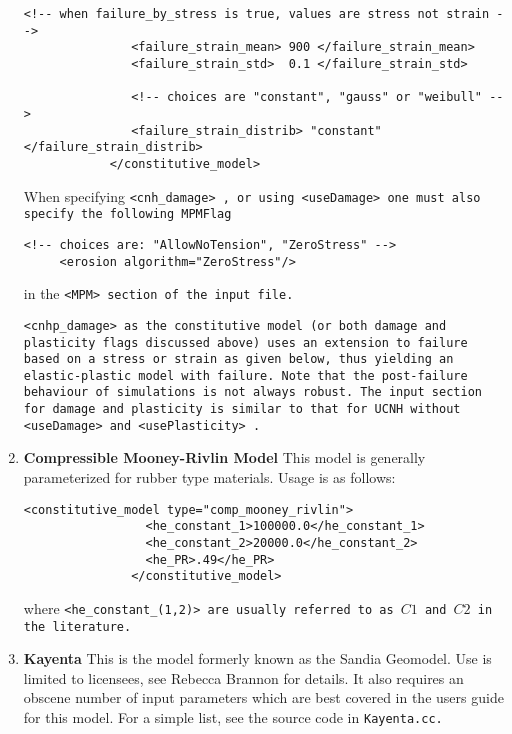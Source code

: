 \begin{enumerate}
\begin{Verbatim}[fontsize=\footnotesize]
               <!-- when failure_by_stress is true, values are stress not strain -->
               <failure_strain_mean> 900 </failure_strain_mean>
               <failure_strain_std>  0.1 </failure_strain_std>

               <!-- choices are "constant", "gauss" or "weibull" -->
               <failure_strain_distrib> "constant" </failure_strain_distrib>
            </constitutive_model>
\end{Verbatim}


When specifying \tt <cnh\_damage> \normalfont, or using \tt <useDamage> \normalfont one must also specify
the following MPMFlag
\begin{Verbatim}[fontsize=\footnotesize]
     <!-- choices are: "AllowNoTension", "ZeroStress" -->
     <erosion algorithm="ZeroStress"/>
\end{Verbatim}
in the \tt <MPM> \normalfont section of the input file.

\tt <cnhp\_damage> \normalfont as the constitutive model (or both damage and plasticity
 flags discussed above) uses an extension
to failure based on a stress or strain as given below, thus yielding an
elastic-plastic model with failure.  Note that the post-failure behaviour of
simulations is not always robust.  The input section for damage and plasticity is
similar to that for UCNH without \tt <useDamage> \normalfont and \tt <usePlasticity> \normalfont.


\item{\bf Compressible Mooney-Rivlin Model} This model is generally parameterized
for rubber type materials.  Usage is as follows:
\begin{Verbatim}[fontsize=\footnotesize]
              <constitutive_model type="comp_mooney_rivlin">
                 <he_constant_1>100000.0</he_constant_1>
                 <he_constant_2>20000.0</he_constant_2>
                 <he_PR>.49</he_PR>
               </constitutive_model>
\end{Verbatim}
where \tt <he\_constant\_(1,2)> \normalfont are usually referred to
as $C1$ and $C2$ in the literature.

\item{\bf Kayenta} This is the model formerly known as the Sandia Geomodel.  Use
is limited to licensees, see Rebecca Brannon for details.  It also requires
an obscene number of input parameters which are best covered in the users
guide for this model.  For a simple list, see the source code in
\tt Kayenta.cc. \normalfont


\end{enumerate}
